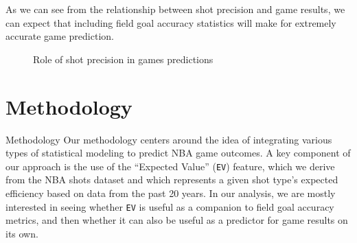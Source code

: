 \documentclass[
  ignorenonframetext,
]{beamer}
\begin{document}
\begin{frame}
As we can see from the relationship between shot precision and game
results, we can expect that including field goal accuracy statistics
will make for extremely accurate game prediction.

\begin{figure}

{\centering {}

}

\caption{Role of shot precision in games predictions}\label{fig:fgpred}
\end{figure}
\end{frame}

\hypertarget{methodology}{%
\section{Methodology}\label{methodology}}

\begin{frame}[fragile]{Methodology}
Our methodology centers around the idea of integrating various types of
statistical modeling to predict NBA game outcomes. A key component of
our approach is the use of the ``Expected Value'' (\texttt{EV}) feature,
which we derive from the NBA shots dataset and which represents a given
shot type's expected efficiency based on data from the past 20 years. In
our analysis, we are mostly interested in seeing whether \texttt{EV} is
useful as a companion to field goal accuracy metrics, and then whether
it can also be useful as a predictor for game results on its own.
\end{frame}
\end{document}
